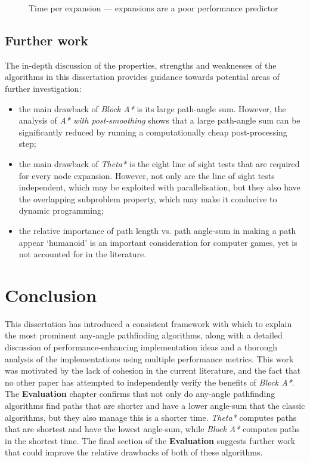 \documentclass[12pt,notitlepage]{report}
\begin{document}
\begin{figure}
\centering

\caption[Time per expansion]{Time per expansion --- expansions are a poor performance predictor}
\end{figure}

\section{Further work}
The in-depth discussion of the properties, strengths and weaknesses of the algorithms in this dissertation provides guidance towards potential areas of further investigation:
\begin{itemize}
\item the main drawback of {\em Block A*} is its large path-angle sum. However, the analysis of {\em A* with post-smoothing} shows that a large path-angle sum can be significantly reduced by running a computationally cheap post-processing step;
\item the main drawback of {\em Theta*} is the eight line of sight tests that are required for every node expansion. However, not only are the line of sight tests independent, which may be exploited with parallelisation, but they also have the overlapping subproblem property, which may make it conducive to dynamic programming;
\item the relative importance of path length vs. path angle-sum in making a path appear `humanoid' is an important consideration for computer games, yet is not accounted for in the literature.
\end{itemize} 

\chapter{Conclusion}
This dissertation has introduced a consistent framework with which to explain the most prominent any-angle pathfinding algorithms, along with a detailed discussion of performance-enhancing implementation ideas and a thorough analysis of the implementations using multiple performance metrics. This work was motivated by the lack of cohesion in the current literature, and the fact that no other paper has attempted to independently verify the benefits of {\em Block A*}.\\

\noindent
The {\bfseries Evaluation} chapter confirms that not only do any-angle pathfinding algorithms find paths that are shorter and have a lower angle-sum that the classic algorithms, but they also manage this is a shorter time. {\em Theta*} computes paths that are shortest and have the lowest angle-sum, while {\em Block A*} computes paths in the shortest time. The final section of the {\bfseries Evaluation} suggests further work that could improve the relative drawbacks of both of these algorithms.\\



{}

\end{document}
